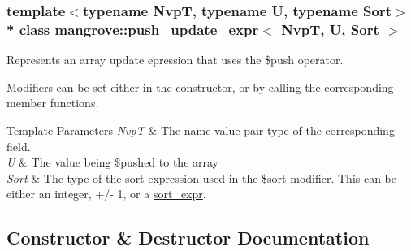 \subsubsection*{template$<$typename NvpT, typename U, typename Sort$>$\\*
class mangrove\+::push\+\_\+update\+\_\+expr$<$ Nvp\+T, U, Sort $>$}

Represents an array update epression that uses the \$push operator. 

Modifiers can be set either in the constructor, or by calling the corresponding member functions. 
\begin{DoxyTemplParams}{Template Parameters}
{\em NvpT} & The name-\/value-\/pair type of the corresponding field. \\
\hline
{\em U} & The value being \$push\textquotesingle{}ed to the array \\
\hline
{\em Sort} & The type of the sort expression used in the \$sort modifier. This can be either an integer, +/-\/ 1, or a \hyperlink{classmangrove_1_1sort__expr}{sort\+\_\+expr}. \\
\hline
\end{DoxyTemplParams}


\subsection{Constructor \& Destructor Documentation}
